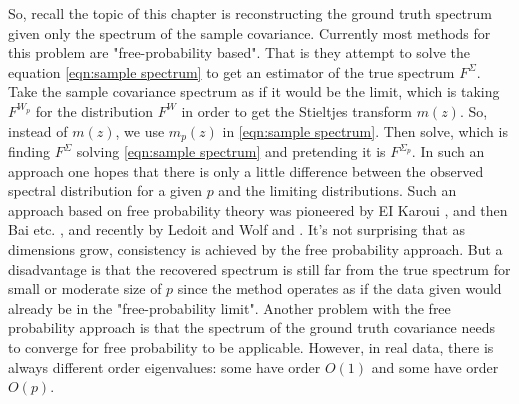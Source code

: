 \documentclass[12pt]{amsart}
\theoremstyle{definition}
\numberwithin{equation}{section}
\numberwithin{equation}{section}
\theoremstyle{remark}
\numberwithin{equation}{section}
\begin{document}
So, recall the topic of this chapter is reconstructing the ground truth spectrum given only the spectrum of the sample covariance. Currently most methods for this problem are "free-probability based". That is they attempt to  solve the equation \ref{eqn:sample spectrum} to get an estimator of the true spectrum $F^{\Sigma}$. Take the sample covariance spectrum as if it would be the limit, which is taking $F^{W_p}$ for the distribution $F^W$ in order to
get the Stieltjes transform $m(z)$. So, instead of $m(z)$, we use $m_p(z)$ in \ref{eqn:sample spectrum}.
Then solve, which is finding $F^\Sigma$ solving \ref{eqn:sample spectrum} and  pretending it is $F^{\Sigma_p}$. In such an approach one hopes that there is only a little difference between the observed spectral distribution for a given $p$ and the limiting distributions. Such an approach based on free probability theory was pioneered by EI Karoui \cite{el2008spectrum}, and then Bai etc. \cite{bai2010estimation}, and recently by Ledoit and Wolf \cite{ledoit2012nonlinear}and \cite{ledoit2015spectrum}. It's not surprising that as dimensions grow, consistency is achieved by the free probability approach. But a disadvantage is that the recovered spectrum is still far from the true spectrum for small or moderate size of $p$ since the method operates as if the data given would already be in the "free-probability limit". Another problem with the free probability approach is that the spectrum of the ground truth covariance needs to converge for free probability to be applicable. However, in real data, there is always different order eigenvalues: some have order $O(1)$ and some have order $O(p)$.
 
\end{document}
